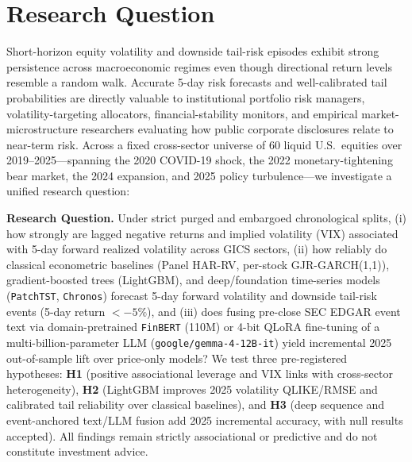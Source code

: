 \documentclass[11pt,a4paper]{article}
\begin{document}
\setcounter{page}{1}

\section{Research Question}

Short-horizon equity volatility and downside tail-risk episodes exhibit strong
persistence across macroeconomic regimes even though directional return levels
resemble a random walk. Accurate 5-day risk forecasts and well-calibrated tail
probabilities are directly valuable to institutional portfolio risk managers,
volatility-targeting allocators, financial-stability monitors, and empirical
market-microstructure researchers evaluating how public corporate disclosures
relate to near-term risk. Across a fixed cross-sector universe of
60 liquid U.S.\ equities over 2019--2025---spanning the 2020
COVID-19 shock, the 2022 monetary-tightening bear market, the 2024 expansion,
and 2025 policy turbulence---we investigate a unified research question:

\textbf{Research Question.} Under strict purged and embargoed chronological
splits, (i) how strongly are lagged negative returns and implied volatility
(VIX) associated with 5-day forward realized volatility across GICS sectors,
(ii) how reliably do classical econometric baselines (Panel HAR-RV, per-stock
GJR-GARCH(1,1)), gradient-boosted trees (LightGBM), and deep/foundation
time-series models (\texttt{PatchTST}, \texttt{Chronos}) forecast 5-day
forward volatility and downside tail-risk events (5-day return $< -5\%$), and
(iii) does fusing pre-close SEC EDGAR event text via domain-pretrained
\texttt{FinBERT} (110M) or 4-bit QLoRA fine-tuning of a multi-billion-parameter
LLM (\texttt{google/gemma-4-12B-it}) yield incremental 2025 out-of-sample lift over
price-only models? We test three pre-registered hypotheses: \textbf{H1}
(positive associational leverage and VIX links with cross-sector heterogeneity),
\textbf{H2} (LightGBM improves 2025 volatility QLIKE/RMSE and calibrated tail
reliability over classical baselines), and \textbf{H3} (deep sequence and
event-anchored text/LLM fusion add 2025 incremental accuracy, with null results
accepted). All findings remain strictly associational or predictive and do not
constitute investment advice.
\end{document}
